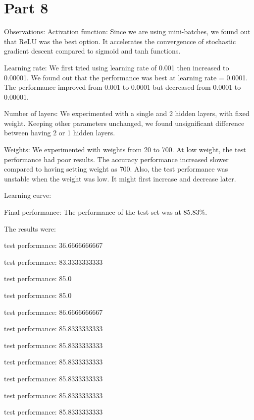 \documentclass{article}
\newcommand{\enterProblemHeader}[1]{
}
\newcommand{\exitProblemHeader}[1]{
}
\newcounter{homeworkProblemCounter} %
\newcommand{\homeworkProblemName}{}
\newenvironment{homeworkProblem}[1][Problem \arabic{homeworkProblemCounter}]{ %
	\stepcounter{homeworkProblemCounter} %
	\renewcommand{\homeworkProblemName}{#1} %
	\section{\homeworkProblemName} %
	\enterProblemHeader{\homeworkProblemName} %
}{
	\exitProblemHeader{\homeworkProblemName} %
}
\begin{document}
\begin{homeworkProblem}[Part 8]
		Observations:
		Activation function: Since we are using mini-batches, we found out that ReLU was the best option. It accelerates the convergencce of stochastic gradient descent compared to sigmoid and tanh functions.
		
		Learning rate: We first tried using learning rate of 0.001 then increased to 0.00001. We found out that the performance was best at learning rate = 0.0001. The performance improved from 0.001 to 0.0001 but decreased from 0.0001 to 0.00001. 
		
		Number of layers: We experimented with a single and 2 hidden layers, with fixed weight. Keeping other parameters unchanged, we found unsignificant difference between having 2 or 1 hidden layers.
		
		Weights: We experimented with weights from 20 to 700. At low weight, the test performance had poor results. The accuracy performance increased slower compared to having setting weight as 700. Also, the test performance was unstable when the weight was low. It might first increase and decrease later.
		
		\clearpage
		Learning curve:
		

		
		Final performance: The performance of the test set was at 85.83\%. 
		
		The results were:
		
		test performance:  36.6666666667
		
		test performance:  83.3333333333
		
		test performance:  85.0
		
		test performance:  85.0
		
		test performance:  86.6666666667
		
		test performance:  85.8333333333
		
		test performance:  85.8333333333
		
		test performance:  85.8333333333
		
		test performance:  85.8333333333
		
		test performance:  85.8333333333
		
		test performance:  85.8333333333
		
	\end{homeworkProblem}
	
	\clearpage
		
\end{document}
